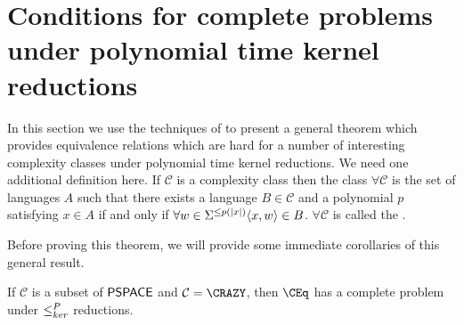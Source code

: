 \section{Conditions for complete problems under polynomial time kernel reductions}
\label{sec:generalcompleteness}

In this section we use the techniques of \cite[Theorem~8.7]{bcffm} to present a general theorem which provides equivalence relations which are hard for a number of interesting complexity classes under polynomial time kernel reductions.
We need one additional definition here.
If $\mathcal{C}$ is a complexity class then the class $\forall\mathcal{C}$ is the set of languages $A$ such that there exists a language $B\in\mathcal{C}$ and a polynomial $p$ satisfying $x\in A$ if and only if $\forall w\in\Sigma^{\leq p(|x|)} \langle x,w\rangle\in B$.
$\forall\mathcal{C}$ is called the .

\begin{theorem}\label{thm:generalcompleteness}
  \printcompletenesstheorem
\end{theorem}

Before proving this theorem, we will provide some immediate corollaries of this general result.

\begin{corollary}
  If $\mathcal{C}$ is a subset of ${\mathsf{PSPACE}}$ and $\mathcal{C}=\CRAZY$, then $\CEq$ has a complete problem under $\leq^{P}_{ker}$ reductions.
\end{corollary}

